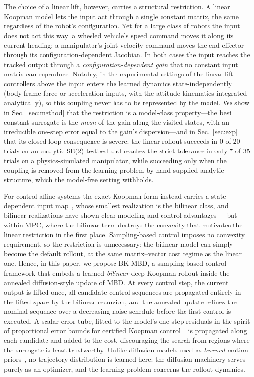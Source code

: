 \documentclass[lettersize,journal]{IEEEtran}
\theoremstyle{remark}
\newcommand{\bkmbd}{\textsc{BK-MBD}}
\begin{document}
The choice of a linear lift, however, carries a structural restriction. A
linear Koopman model lets the input act through a single constant matrix,
the same regardless of the robot's configuration. Yet for a large class of
robots the input does not act this way: a wheeled vehicle's speed command
moves it along its current heading; a manipulator's joint-velocity command
moves the end-effector through its configuration-dependent Jacobian. In both
cases the input reaches the tracked output through a
\emph{configuration-dependent gain} that no constant input matrix can
reproduce. Notably, in the experimental settings of the linear-lift
controllers above the input enters the learned dynamics
state-independently (body-frame force or acceleration inputs, with
the attitude kinematics integrated analytically), so this coupling never
has to be represented by the model. We show in Sec.~\ref{sec:method} that
the restriction is a model-class property---the best constant surrogate is
the \emph{mean} of the gain along the visited states, with an irreducible
one-step error equal to the gain's dispersion---and in Sec.~\ref{sec:exp}
that its closed-loop consequence is severe: the linear rollout succeeds in
$0$ of $20$ trials on an analytic SE(2) testbed and reaches the strict
tolerance in only $7$ of $35$ trials on a physics-simulated manipulator,
while succeeding only when the coupling is removed from the learning
problem by hand-supplied analytic structure, which the model-free setting
withholds.

For control-affine systems the exact Koopman form instead carries a
state-dependent input map~\cite{iacob2024}, whose smallest realization is
the bilinear class, and bilinear realizations have shown clear modeling
and control advantages~\cite{bruder2021bilinear, folkestad2021,
mamakoukas2019}---but within MPC, where the bilinear term destroys the
convexity that motivates the linear restriction in the first place.
Sampling-based control imposes no convexity requirement, so the
restriction is unnecessary: the bilinear model can simply become the
default rollout, at the same matrix--vector cost regime as the linear one.
Hence, in this paper, we propose \bkmbd{}, a sampling-based control
framework that embeds a learned \emph{bilinear} deep Koopman rollout
inside the annealed diffusion-style update of MBD. At every control step,
the current output is lifted once, all candidate control sequences are
propagated entirely in the lifted space by the bilinear recursion, and the
annealed update refines the nominal sequence over a decreasing noise
schedule before the first control is executed. A scalar error tube, fitted
to the model's one-step residuals in the spirit of proportional error
bounds for certified Koopman control~\cite{strasser2026, safedmd2024}, is
propagated along each candidate and added to the cost, discouraging the
search from regions where the surrogate is least trustworthy.
Unlike diffusion models used as \emph{learned} motion
priors~\cite{janner2022planning, chi2025diffusion, carvalho2023motion}, no
trajectory distribution is learned here: the diffusion machinery serves
purely as an optimizer, and the learning problem concerns the rollout
dynamics.
\end{document}
